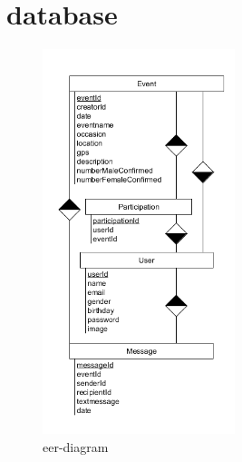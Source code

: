 \section{database}\label{database}


\begin{figure}[htp]
\centering
\includegraphics[width=0.5\textwidth]{Ingo/pictures/EER-diagram.png}
\caption{eer-diagram}
\label{fig:EER diagram}
\end{figure}
